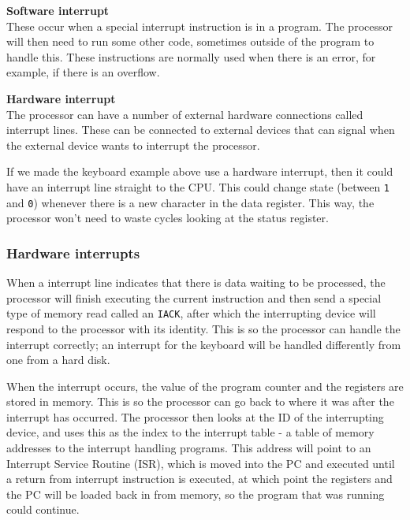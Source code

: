 \begin{description}
  \item \textbf{Software interrupt}\\
    These occur when a special interrupt instruction is in a program. The
    processor will then need to run some other code, sometimes outside of the
    program to handle this. These instructions are normally used when there is
    an error, for example, if there is an overflow.
  \item \textbf{Hardware interrupt}\\
    The processor can have a number of external hardware connections called
    interrupt lines. These can be connected to external devices that can signal
    when the external device wants to interrupt the processor.

    If we made the keyboard example above use a hardware interrupt, then it
    could have an interrupt line straight to the CPU. This could change state
    (between \texttt{1} and \texttt{0}) whenever there is a new character in the
    data register. This way, the processor won't need to waste cycles looking at
    the status register.
\end{description}

\subsubsection{Hardware interrupts}


When a interrupt line indicates that there is data waiting to be processed, the
processor will finish executing the current instruction and then send a special
type of memory read called an \texttt{IACK}, after which the interrupting device
will respond to the processor with its identity. This is so the processor can
handle the interrupt correctly; an interrupt for the keyboard will be handled
differently from one from a hard disk.

When the interrupt occurs, the value of the program counter and the registers
are stored in memory. This is so the processor can go back to where it was after
the interrupt has occurred. The processor then looks at the ID of the
interrupting device, and uses this as the index to the interrupt table - a table
of memory addresses to the interrupt handling programs. This address will point
to an Interrupt Service Routine (ISR), which is moved into the PC and executed
until a return from interrupt instruction is executed, at which point the
registers and the PC will be loaded back in from memory, so the program that was
running could continue.

